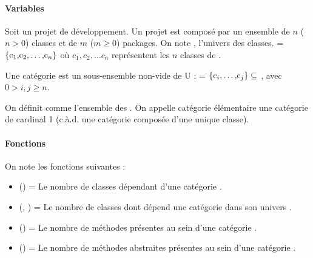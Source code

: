 \documentclass{scrartcl}
\begin{document}
    \paragraph{Variables}Soit \project{} un projet de développement. Un projet \project{} est composé par un ensemble de $n$ ($n > 0$) classes et de $m$ ($m \geq 0$) packages. On note \classUniverse{}, l'univers des classes. \classUniverse{} = $\{\class{}_1, \class{}_2, \dots, \class{}_n\}$ où $c_1, c_2, ... c_n$ représentent les $n$ classes de \project.

    Une catégorie \category{} est un sous-ensemble non-vide de U : \category{} = $ \{\class{}_i, \dots, \class{}_j\} \subseteq$ \classUniverse{}, avec $0 > i, j \geq n$.

    On définit \categoryUniverse{} comme l'ensemble des \category{}. On appelle catégorie élémentaire une catégorie de cardinal 1 (c.à.d. une catégorie composée d'une unique classe).

    \paragraph{Fonctions}On note les fonctions suivantes :
    \begin{itemize}
        \item \dependantClasses{}(\category{}) = Le nombre de classes dépendant d'une catégorie \category{}.
        \item \dependedClasses{}(\category{}, \categoryUniverse{}) = Le nombre de classes dont dépend une catégorie \category{} dans son univers \categoryUniverse{}.
        \item \numberOfMethod{}(\category{}) = Le nombre de méthodes présentes au sein d'une catégorie \category{}.
        \item \numberOfabstractMethod{}(\category{}) = Le nombre de méthodes abstraites présentes au sein d'une catégorie \category{}.
    \end{itemize}
\end{document}
